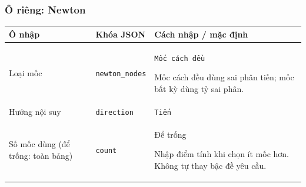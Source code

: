 \subsubsection*{Ô riêng: Newton}
\begin{center}\small\begin{tabular}{@{}p{.32\linewidth}p{.17\linewidth}p{.43\linewidth}@{}}\toprule
Ô nhập & Khóa JSON & Cách nhập / mặc định\\\midrule
Loại mốc & \texttt{newton\_nodes} & \texttt{Mốc cách đều}
\par Mốc cách đều dùng sai phân tiến;\allowbreak{} mốc bất kỳ dùng tỷ sai phân.\\[3pt]
Hướng nội suy & \texttt{direction} & \texttt{Tiến}\\[3pt]
Số mốc dùng (để trống: toàn bảng) & \texttt{count} & Để trống
\par Nhập điểm tính khi chọn ít mốc hơn. Không tự thay bậc đề yêu cầu.\\[3pt]
\bottomrule\end{tabular}\end{center}
